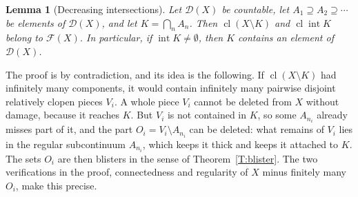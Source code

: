 \documentclass[11pt,reqno]{amsart}
\theoremstyle{plain}
\newtheorem{lemma}[theorem]{Lemma}
\theoremstyle{definition}
\theoremstyle{remark}
\newcommand{\D}{\mathcal{D}}
\newcommand{\F}{\mathscr{F}}
\newcommand{\cl}{\operatorname{cl}}
\newcommand{\intr}{\operatorname{int}}
\begin{document}
\begin{lemma}[Decreasing intersections]\label{L:decreasing}
Let $\D(X)$ be countable, let $A_1\supseteq A_2\supseteq\cdots$ be elements of $\D(X)$, and let $K=\bigcap_nA_n$. Then $\cl(X\setminus K)$ and $\cl\intr K$ belong to $\F(X)$. In particular, if $\intr K\neq\emptyset$, then $K$ contains an element of $\D(X)$.
\end{lemma}

The proof is by contradiction, and its idea is the following. If $\cl(X\setminus K)$ had infinitely many components, it would contain infinitely many pairwise disjoint relatively clopen pieces $V_i$. A whole piece $V_i$ cannot be deleted from $X$ without damage, because it reaches $K$. But $V_i$ is not contained in $K$, so some $A_{n_i}$ already misses part of it, and the part $O_i=V_i\setminus A_{n_i}$ can be deleted: what remains of $V_i$ lies in the regular subcontinuum $A_{n_i}$, which keeps it thick and keeps it attached to $K$. The sets $O_i$ are then blisters in the sense of Theorem~\ref{T:blister}. The two verifications in the proof, connectedness and regularity of $X$ minus finitely many $O_i$, make this precise.
\end{document}
